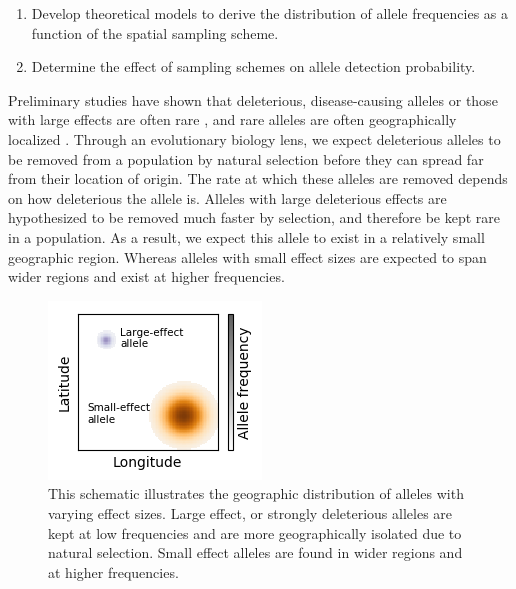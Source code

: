\begin{enumerate}
    \item Develop theoretical models to derive the distribution of allele frequencies as a function of the spatial sampling scheme.
    \item Determine the effect of sampling schemes on allele detection probability.
\end{enumerate}


Preliminary studies have shown that deleterious, disease-causing alleles or those with large effects are often rare \cite{marouli_rare_2017} \cite{slatkin_estimating_2000}, and rare alleles are often geographically localized \cite{visscher_r.._2019}\cite{slatkin_spatial_1978}. Through an evolutionary biology lens, we expect deleterious alleles to be removed from a population by natural selection before they can spread far from their location of origin. The rate at which these alleles are removed depends on how deleterious the allele is. Alleles with large deleterious effects are hypothesized to be removed much faster by selection, and therefore be kept rare in a population. As a result, we expect this allele to exist in a relatively small geographic region. Whereas alleles with small effect sizes are expected to span wider regions and exist at higher frequencies. 

\begin{figure}[h]
    \centering
\includegraphics[scale=1.5]{img/spatial_distributions.png}
    \caption{This schematic illustrates the geographic distribution of alleles with varying effect sizes. Large effect, or strongly deleterious alleles are kept at low frequencies and are more geographically isolated due to natural selection. Small effect alleles are found in wider regions and at higher frequencies.}
    \label{fig:spatial_schematic}
\end{figure}


